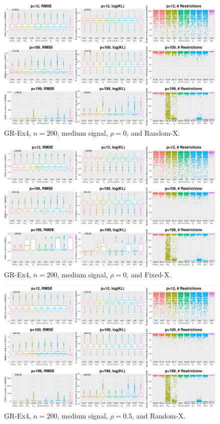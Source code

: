 \clearpage
\begin{figure}[!ht]
\centering
\includegraphics[width=\textwidth]{figures/supplement/randomx_GR-Ex4_n200_msnr_rho0.eps}
\caption{GR-Ex4, $n=200$, medium signal, $\rho=0$, and Random-X.}
\end{figure}
\begin{figure}[!ht]
\centering
\includegraphics[width=\textwidth]{figures/supplement/fixedx_GR-Ex4_n200_msnr_rho0.eps}
\caption{GR-Ex4, $n=200$, medium signal, $\rho=0$, and Fixed-X.}
\end{figure}
\clearpage
\begin{figure}[!ht]
\centering
\includegraphics[width=\textwidth]{figures/supplement/randomx_GR-Ex4_n200_msnr_rho05.eps}
\caption{GR-Ex4, $n=200$, medium signal, $\rho=0.5$, and Random-X.}
\end{figure}
